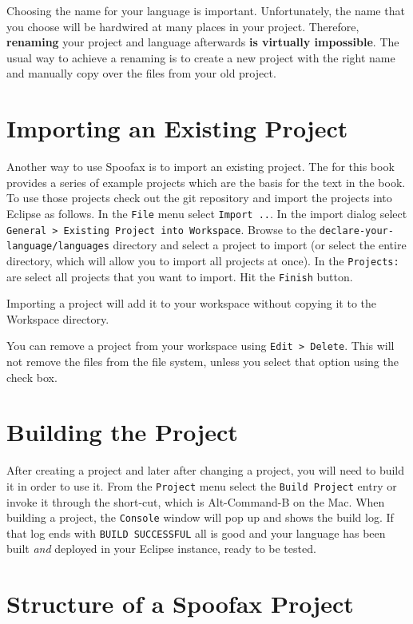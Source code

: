 Choosing the name for your language is important. Unfortunately, the name that
you choose will be hardwired at many places in your project. Therefore,
\textbf{renaming} your project and language afterwards \textbf{is virtually
impossible}.
The usual way to achieve a renaming is to create a new project with the right
name and manually copy over the files from your old project.

\section{Importing an Existing Project}

Another way to use Spoofax is to import an existing project. The
 for this book provides a series of example
projects which are the basis for the text in the book. To use those projects
check out the git repository and import the projects into Eclipse as follows.
In the \texttt{File} menu select \texttt{Import ..}. In the import dialog
select \texttt{General > Existing Project into Workspace}. Browse to the
\texttt{declare-your-language/languages} directory and select a project to
import (or select the entire directory, which will allow you to import all
projects at once). In the \texttt{Projects:} are select all projects that you
want to import. Hit the \texttt{Finish} button. 

Importing a project will add it to your workspace without copying it to the
Workspace directory.

You can remove a project from your workspace using \texttt{Edit > Delete}. This
will not remove the files from the file system, unless you select that option
using the check box.


\section{Building the Project}

After creating a project and later after changing a project, you will need to
build it in order to use it. From the \texttt{Project} menu select the
\texttt{Build Project} entry or invoke it through the short-cut, which is
Alt-Command-B on the Mac. When building a project, the \texttt{Console} window
will pop up and shows the build log. If that log ends with \texttt{BUILD
SUCCESSFUL} all is good and your language has been built \emph{and} deployed in
your Eclipse instance, ready to be tested.

\section{Structure of a Spoofax Project}

